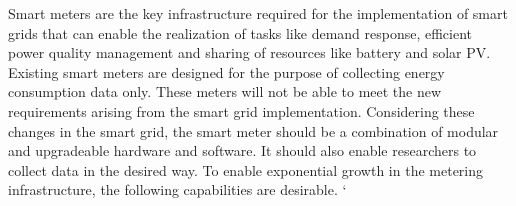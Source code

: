Smart meters are the key infrastructure required for the implementation of smart grids that can enable the realization of tasks like demand response, efficient power quality management and sharing of resources like battery and solar PV. Existing smart meters are designed for the purpose of collecting energy consumption data only. These meters will not be able to meet the new requirements arising from the smart grid implementation. Considering these changes in the smart grid, the smart meter should be a combination of modular and upgradeable hardware and software. It should also enable researchers to collect data in the desired way. To enable exponential growth in the metering infrastructure, the following capabilities are desirable.
`


